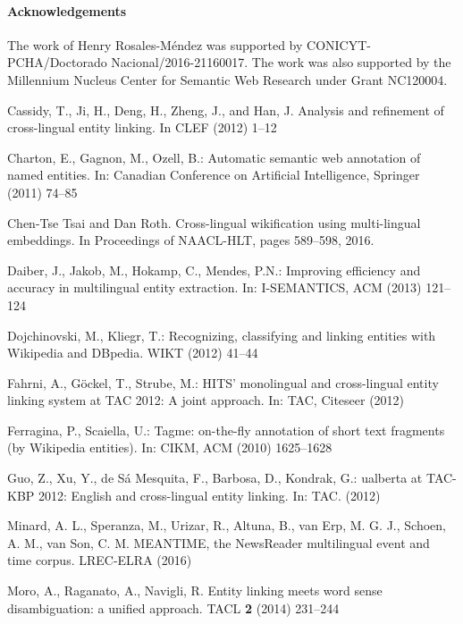 \documentclass{llncs}
\begin{document}
{\footnotesize
\paragraph{Acknowledgements} The work of Henry Rosales-M\'endez was supported by CONICYT-PCHA/Doctorado Nacional/2016-21160017. The work was also supported by the Millennium Nucleus Center for Semantic Web Research under Grant NC120004.}



\begin{thebibliography}{99}

Cassidy, T., Ji, H., Deng, H., Zheng, J., and Han, J. Analysis and refinement of cross-lingual entity linking. In CLEF (2012) 1--12

Charton, E., Gagnon, M., Ozell, B.: Automatic semantic web annotation of named entities. In: Canadian Conference on Artificial Intelligence, Springer (2011) 74--85

Chen-Tse Tsai and Dan Roth. Cross-lingual wikification using multi-lingual embeddings. In Proceedings of NAACL-HLT, pages 589–598, 2016.

Daiber, J., Jakob, M., Hokamp, C., Mendes, P.N.: Improving efficiency and accuracy in multilingual entity extraction. In: I-SEMANTICS, ACM (2013) 121--124

Dojchinovski, M., Kliegr, T.: Recognizing, classifying and linking entities with {W}ikipedia and {DB}pedia. WIKT (2012) 41--44

Fahrni, A., G{\"o}ckel, T., Strube, M.: {HITS'} monolingual and cross-lingual entity linking system at {TAC} 2012: A joint approach. In: TAC, Citeseer (2012)

Ferragina, P., Scaiella, U.: Tagme: on-the-fly annotation of short text fragments (by Wikipedia entities). In: CIKM, ACM (2010) 1625--1628

Guo, Z., Xu, Y., de S{\'a} Mesquita, F., Barbosa, D., Kondrak, G.: ualberta at {TAC-KBP} 2012: English and cross-lingual entity linking. In: TAC. (2012)

Minard, A. L., Speranza, M., Urizar, R., Altuna, B., van Erp, M. G. J., Schoen, A. M., van Son, C. M. MEANTIME, the NewsReader multilingual event and time corpus. LREC-ELRA (2016)

Moro, A., Raganato, A.,  Navigli, R. Entity linking meets word sense disambiguation: a unified approach. TACL \textbf{2} (2014) 231--244


\end{thebibliography}
\end{document}
